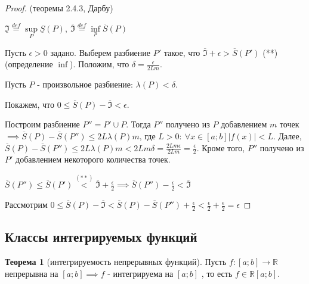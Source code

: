 \documentclass{report}
\theoremstyle{definition}
\newtheorem{theorem}{Теорема}[section]
\begin{document}
\begin{proof}
  (теоремы 2.4.3, Дарбу)

  $\underline{\mathfrak{I}} \overset{def}{=} \underset{P}{\sup}\underline{S}(P), \ \overline{\mathfrak{I}}
    \overset{def}{=} \underset{p}{\inf}\overline{S}(P)$

  Пусть $\epsilon > 0$ задано. Выберем разбиение $P'$ такое, что $\overline{\mathfrak{I}} + \epsilon >
    \overline{S}(P')$ (**) (определение $\inf$). Положим, что $\delta = \frac{\epsilon}{2Lm}$.

  Пусть $P$ - произвольное разбиение: $\lambda (P) < \delta$.

  Покажем, что $0 \leqslant \overline{S}(P) - \overline{\mathfrak{I}} < \epsilon$.

  Построим разбиение $P'' = P' \cup P$. Тогда $P''$ получено из $P$ добавлением $m$ точек $\implies
    \overline{S}(P) - \overline{S}(P'') \leqslant 2L\lambda(P)m$, где $L>0: \ \forall x \in [a;b] | f(x) |
    < L$. Далее, $\overline{S}(P) - \overline{S}(P'')\leqslant2L\lambda(P)m < 2Lm\delta = \frac{2Lm\epsilon}
    {2Lm} = \frac{\epsilon}{2}$. Кроме того, $P''$ получено из $P'$ добавлением некоторого количества точек.
  \begin{center}
    {\large $\overline{S}(P'')\leqslant\overline{S}(P')\overset{(**)}{<} \overline{\mathfrak{I}} + \frac
        {\epsilon}{2}\implies \overline{S}(P'')-\frac{\epsilon}{2}<\overline{\mathfrak{I}}$}
  \end{center}
  Рассмотрим $0\leqslant\overline{S}(P) - \overline{\mathfrak{I}} < \overline{S}(P) - \overline{S}(P'') +
    \frac{\epsilon}{2} < \frac{\epsilon}{2} + \frac{\epsilon}{2} = \epsilon$
\end{proof}

\subsection{Классы интегрируемых функций}

\begin{theorem}[интегрируемость непрерывных функций]
  Пусть $f:[a;b]\rightarrow\mathbb{R}$ непрерывна на $[a;b]\implies f$ - интегрируема на $[a;b]$
  , то есть $f\in\mathbb{R}[a;b]$.
\end{theorem}
\end{document}
